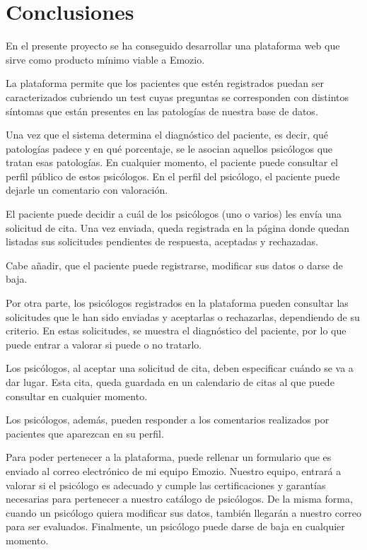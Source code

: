 \chapter{Conclusiones}

En el presente proyecto se ha conseguido desarrollar una plataforma web que sirve como producto mínimo viable a Emozio.


La plataforma permite que los pacientes que estén registrados puedan ser caracterizados cubriendo un test cuyas preguntas se corresponden con distintos síntomas que están presentes en las patologías de nuestra base de datos.


Una vez que el sistema determina el diagnóstico del paciente, es decir, qué patologías padece y en qué porcentaje, se le asocian aquellos psicólogos que tratan esas patologías. En cualquier momento, el paciente puede consultar el perfil público de estos psicólogos. En el perfil del psicólogo, el paciente puede dejarle un comentario con valoración.


El paciente puede decidir a cuál de los psicólogos (uno o varios) les envía una solicitud de cita. Una vez enviada, queda registrada en la página donde quedan listadas sus solicitudes pendientes de respuesta, aceptadas y rechazadas.


Cabe añadir, que el paciente puede registrarse, modificar sus datos o darse de baja.


Por otra parte, los psicólogos registrados en la plataforma pueden consultar las solicitudes que le han sido enviadas y aceptarlas o rechazarlas, dependiendo de su criterio. En estas solicitudes, se muestra el diagnóstico del paciente, por lo que puede entrar a valorar si puede o no tratarlo.


Los psicólogos, al aceptar una solicitud de cita, deben especificar cuándo se va a dar lugar. Esta cita, queda guardada en un calendario de citas al que puede consultar en cualquier momento.


Los psicólogos, además, pueden responder a los comentarios realizados por pacientes que aparezcan en su perfil.


Para poder pertenecer a la plataforma, puede rellenar un formulario que es enviado al correo electrónico de mi equipo Emozio. Nuestro equipo, entrará a valorar si el psicólogo es adecuado y cumple las certificaciones y garantías necesarias para pertenecer a nuestro catálogo de psicólogos. De la misma forma, cuando un psicólogo quiera modificar sus datos, también llegarán a nuestro correo para ser evaluados. Finalmente, un psicólogo puede darse de baja en cualquier momento.


